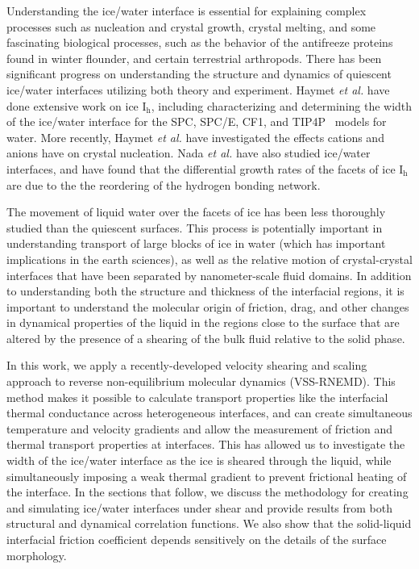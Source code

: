 \documentclass[11pt]{article}
\begin{document}
\begin{doublespace}

Understanding the ice/water interface is essential for explaining
complex processes such as nucleation and crystal
growth,\cite{Han92,Granasy95,Vanfleet95} crystal
melting,\cite{Weber83,Han92,Sakai96,Sakai96B} and some fascinating
biological processes, such as the behavior of the antifreeze proteins
found in winter flounder,\cite{Wierzbicki07, Chapsky97} and certain
terrestrial arthropods.\cite{Duman:2001qy,Meister29012013} There has
been significant progress on understanding the structure and dynamics
of quiescent ice/water interfaces utilizing both theory and
experiment.  Haymet \emph{et al.} have done extensive work on ice I$_\mathrm{h}$,
including characterizing and determining the width of the ice/water
interface for the SPC,\cite{Karim90} SPC/E,\cite{Gay02,Bryk02} CF1,\cite{Hayward01,Hayward02} and TIP4P~\cite{Karim88} models for
water.
More recently, Haymet \emph{et al.} have investigated the effects
cations and anions have on crystal
nucleation.\cite{Bryk04,Smith05,Wilson08,Wilson10} Nada \emph{et al.}
have also studied ice/water
interfaces,\cite{Nada95,Nada00,Nada03,Nada12} and have found that the
differential growth rates of the facets of ice I$_\mathrm{h}$ are due to the the
reordering of the hydrogen bonding network.\cite{Nada05}

The movement of liquid water over the facets of ice has been less
thoroughly studied than the quiescent surfaces. This process is
potentially important in understanding transport of large blocks of
ice in water (which has important implications in the earth sciences),
as well as the relative motion of crystal-crystal interfaces that have
been separated by nanometer-scale fluid domains.  In addition to
understanding both the structure and thickness of the interfacial
regions, it is important to understand the molecular origin of
friction, drag, and other changes in dynamical properties of the
liquid in the regions close to the surface that are altered by the
presence of a shearing of the bulk fluid relative to the solid phase.

In this work, we apply a recently-developed velocity shearing and
scaling approach to reverse non-equilibrium molecular dynamics
(VSS-RNEMD). This method makes it possible to calculate transport
properties like the interfacial thermal conductance across
heterogeneous interfaces,\cite{Kuang12} and can create simultaneous
temperature and velocity gradients and allow the measurement of
friction and thermal transport properties at interfaces.  This has
allowed us to investigate the width of the ice/water interface as the
ice is sheared through the liquid, while simultaneously imposing a
weak thermal gradient to prevent frictional heating of the interface.
In the sections that follow, we discuss the methodology for creating
and simulating ice/water interfaces under shear and provide results
from both structural and dynamical correlation functions.  We also
show that the solid-liquid interfacial friction coefficient depends
sensitively on the details of the surface morphology.


\end{doublespace}
\end{document}
